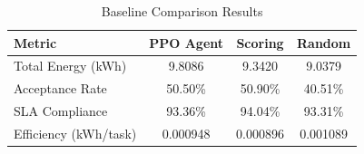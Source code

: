 
\begin{table}[h]
\centering
\caption{Baseline Comparison Results}
\label{tab:baseline}
\begin{tabular}{lccc}
\toprule
\textbf{Metric} & \textbf{PPO Agent} & \textbf{Scoring} & \textbf{Random} \\
\midrule
Total Energy (kWh) & 9.8086 & 9.3420 & 9.0379 \\
Acceptance Rate & 50.50\% & 50.90\% & 40.51\% \\
SLA Compliance & 93.36\% & 94.04\% & 93.31\% \\
Efficiency (kWh/task) & 0.000948 & 0.000896 & 0.001089 \\
\bottomrule
\end{tabular}
\end{table}
